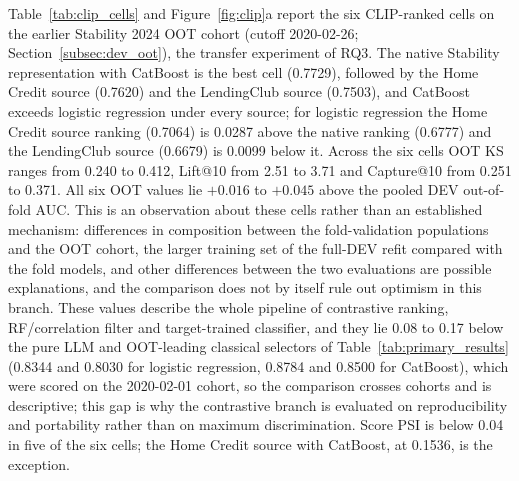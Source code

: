 \documentclass[final,5p,twocolumn]{elsarticle}
\begin{document}
Table~\ref{tab:clip_cells} and Figure~\ref{fig:clip}a report the six CLIP-ranked cells on the earlier Stability 2024 OOT cohort (cutoff 2020-02-26; Section~\ref{subsec:dev_oot}), the transfer experiment of RQ3. The native Stability representation with CatBoost is the best cell (0.7729), followed by the Home Credit source (0.7620) and the LendingClub source (0.7503), and CatBoost exceeds logistic regression under every source; for logistic regression the Home Credit source ranking (0.7064) is 0.0287 above the native ranking (0.6777) and the LendingClub source (0.6679) is 0.0099 below it. Across the six cells OOT KS ranges from 0.240 to 0.412, Lift@10 from 2.51 to 3.71 and Capture@10 from 0.251 to 0.371. All six OOT values lie $+0.016$ to $+0.045$ above the pooled DEV out-of-fold AUC. This is an observation about these cells rather than an established mechanism: differences in composition between the fold-validation populations and the OOT cohort, the larger training set of the full-DEV refit compared with the fold models, and other differences between the two evaluations are possible explanations, and the comparison does not by itself rule out optimism in this branch. These values describe the whole pipeline of contrastive ranking, RF/correlation filter and target-trained classifier, and they lie 0.08 to 0.17 below the pure LLM and OOT-leading classical selectors of Table~\ref{tab:primary_results} (0.8344 and 0.8030 for logistic regression, 0.8784 and 0.8500 for CatBoost), which were scored on the 2020-02-01 cohort, so the comparison crosses cohorts and is descriptive; this gap is why the contrastive branch is evaluated on reproducibility and portability rather than on maximum discrimination. Score PSI is below 0.04 in five of the six cells; the Home Credit source with CatBoost, at 0.1536, is the exception.
\end{document}
